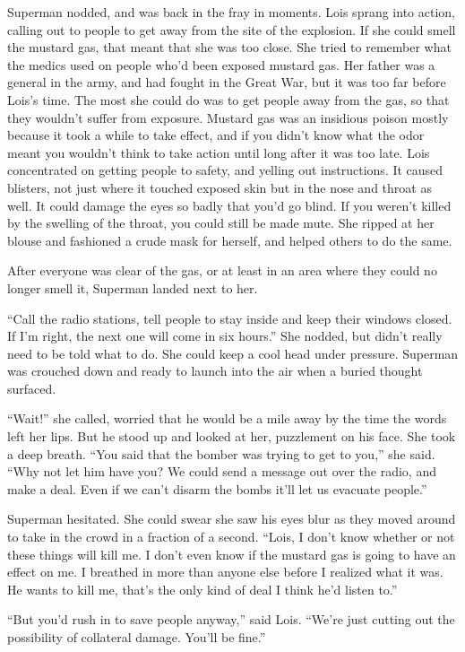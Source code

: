 Superman nodded, and was back in the fray in moments. Lois sprang into
action, calling out to people to get away from the site of the
explosion. If she could smell the mustard gas, that meant that she was
too close. She tried to remember what the medics used on people who'd
been exposed mustard gas. Her father was a general in the army, and had
fought in the Great War, but it was too far before Lois's time. The most
she could do was to get people away from the gas, so that they wouldn't
suffer from exposure. Mustard gas was an insidious poison mostly because
it took a while to take effect, and if you didn't know what the odor
meant you wouldn't think to take action until long after it was too
late. Lois concentrated on getting people to safety, and yelling out
instructions. It caused blisters, not just where it touched exposed skin
but in the nose and throat as well. It could damage the eyes so badly
that you'd go blind. If you weren't killed by the swelling of the
throat, you could still be made mute. She ripped at her blouse and
fashioned a crude mask for herself, and helped others to do the same.

After everyone was clear of the gas, or at least in an area where they
could no longer smell it, Superman landed next to her.

``Call the radio stations, tell people to stay inside and keep their
windows closed. If I'm right, the next one will come in six hours.'' She
nodded, but didn't really need to be told what to do. She could keep a
cool head under pressure. Superman was crouched down and ready to launch
into the air when a buried thought surfaced.

``Wait!'' she called, worried that he would be a mile away by the time
the words left her lips. But he stood up and looked at her, puzzlement
on his face. She took a deep breath. ``You said that the bomber was
trying to get to you,'' she said. ``Why not let him have you? We could
send a message out over the radio, and make a deal. Even if we can't
disarm the bombs it'll let us evacuate people.''

Superman hesitated. She could swear she saw his eyes blur as they moved
around to take in the crowd in a fraction of a second. ``Lois, I don't
know whether or not these things will kill me. I don't even know if the
mustard gas is going to have an effect on me. I breathed in more than
anyone else before I realized what it was. He wants to kill me, that's
the only kind of deal I think he'd listen to.''

``But you'd rush in to save people anyway,'' said Lois. ``We're just
cutting out the possibility of collateral damage. You'll be fine.''

